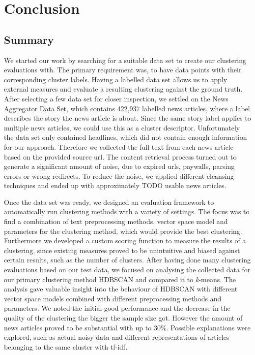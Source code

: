 \section{Conclusion}
\label{sec:6_conclusion}

\subsection{Summary}
\label{subsec:6_summary}

We started our work by searching for a suitable data set to create our clustering evaluations with.
The primary requirement was, to have data points with their corresponding cluster labels.
Having a labelled data set allows us to apply external measures
and evaluate a resulting clustering against the ground truth.
After selecting a few data set for closer inspection, we settled on the News Aggregator Data Set,
which contains 422,937 labelled news articles, where a label describes the story the news article is about.
Since the same story label applies to multiple news articles, we could use this as a cluster descriptor.
Unfortunately the data set only contained headlines, which did not contain enough information for our approach.
Therefore we collected the full text from each news article based on the provided source url.
The content retrieval process turned out to generate a significant amount of noise,
due to expired urls, paywalls, parsing errors or wrong redirects.
To reduce the noise, we applied different cleansing techniques
and ended up with approximately TODO usable news articles.

Once the data set was ready, we designed an evaluation framework to automatically run clustering methods
with a variety of settings.
The focus was to find a combination of text preprocessing methods,
vector space model and parameters for the clustering method, which would provide the best clustering.
Furthermore we developed a custom scoring function to measure the results of a clustering,
since existing measures proved to be unintuitive and biased against certain results,
such as the number of clusters.
After having done many clustering evaluations based on our test data,
we focused on analysing the collected data for our primary clustering method HDBSCAN
and compared it to \textit{k}-means.
The analysis gave valuable insight into the behaviour of HDBSCAN with different vector space models
combined with different preprocessing methods and parameters.
We noted the initial good performance and the decrease in the quality of the clustering the bigger the sample size got.
However the amount of news articles proved to be substantial with up to 30\%.
Possible explanations were explored,
such as actual noisy data and different representations of articles belonging to the same cluster with tf-idf.

